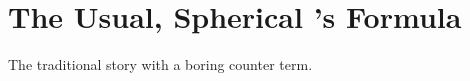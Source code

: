 \section{The Usual, Spherical \Luscher's Formula}\label{sec:spherical}

The traditional story with a boring counter term.
